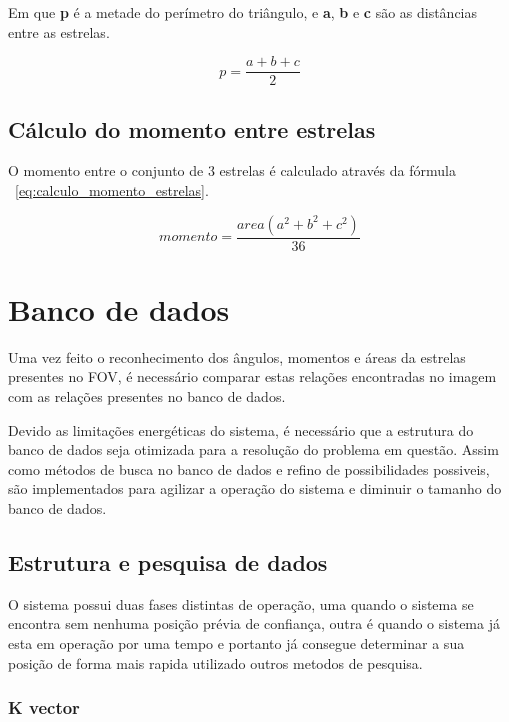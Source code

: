 Em que \textbf{p} é a metade do perímetro do triângulo, e \textbf{a}, \textbf{b} e \textbf{c} são as distâncias entre as estrelas.

\begin{equation}
	p = \frac{a+b+c}{2}
	\label{eq:calculo_area_estrelas_p}
\end{equation}

\subsection{Cálculo do momento entre estrelas}

O momento entre o conjunto de 3 estrelas é calculado através da fórmula ~\ref{eq:calculo_momento_estrelas}.

\begin{equation}
	momento = \frac{area (a^2 + b^2 + c^2)}{36}
	\label{eq:calculo_momento_estrelas}
\end{equation}

\section{Banco de dados}
Uma vez feito o reconhecimento dos ângulos, momentos e áreas da estrelas presentes no FOV, é necessário  comparar estas relações encontradas no imagem com as relações presentes no banco de dados.

Devido as limitações energéticas do sistema, é necessário que a estrutura do banco de dados seja otimizada para a resolução do problema em questão.
Assim como métodos de busca no banco de dados e refino de possibilidades possiveis, são implementados para agilizar a operação do sistema e diminuir o tamanho do banco de dados.

\subsection{Estrutura e pesquisa de dados }
O sistema possui duas fases distintas de operação, uma quando o sistema se encontra sem nenhuma posição prévia de confiança, outra é quando o sistema já esta em operação por uma tempo e portanto já consegue determinar a sua posição de forma mais rapida utilizado outros metodos de pesquisa.

\subsubsection{K vector}

